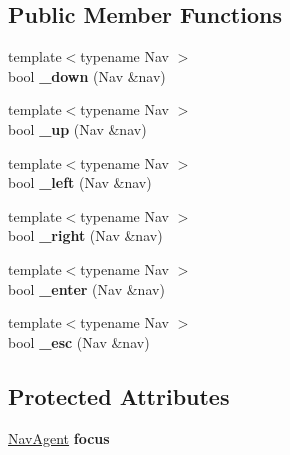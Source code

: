 \subsection*{Public Member Functions}
\begin{DoxyCompactItemize}
\item 
\mbox{\label{classItemNav_a88d3da019727c248ca83b6a5bd1b6ae3}} 
{\footnotesize template$<$typename Nav $>$ }\\bool {\bfseries \+\_\+down} (Nav \&nav)
\item 
\mbox{\label{classItemNav_a97d9b170b12a5e934233fda1c116b34b}} 
{\footnotesize template$<$typename Nav $>$ }\\bool {\bfseries \+\_\+up} (Nav \&nav)
\item 
\mbox{\label{classItemNav_a35fce8f3e0412ec96715e071000e7959}} 
{\footnotesize template$<$typename Nav $>$ }\\bool {\bfseries \+\_\+left} (Nav \&nav)
\item 
\mbox{\label{classItemNav_a4c50b94f9483147cab5a8e732b8475c0}} 
{\footnotesize template$<$typename Nav $>$ }\\bool {\bfseries \+\_\+right} (Nav \&nav)
\item 
\mbox{\label{classItemNav_a73524b209a2442d9921a273ed3718af9}} 
{\footnotesize template$<$typename Nav $>$ }\\bool {\bfseries \+\_\+enter} (Nav \&nav)
\item 
\mbox{\label{classItemNav_a45181d1d1ccbd98500cb2ac060b11ec2}} 
{\footnotesize template$<$typename Nav $>$ }\\bool {\bfseries \+\_\+esc} (Nav \&nav)
\end{DoxyCompactItemize}
\subsection*{Protected Attributes}
\begin{DoxyCompactItemize}
\item 
\mbox{\label{classItemNav_a6b58882d926efce27e342fac54fe853a}} 
\hyperlink{structNavAgent}{Nav\+Agent} {\bfseries focus}
\end{DoxyCompactItemize}


